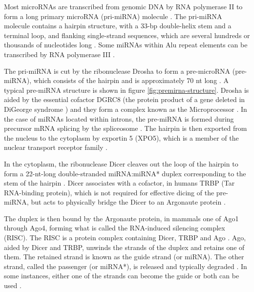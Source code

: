 Most microRNAs are transcribed from genomic DNA by RNA polymerase II to form a
long primary microRNA (pri-miRNA) molecule \citep{Lee2004}. The pri-miRNA molecule
contains a hairpin structure, with a 33-bp double-helix stem and a terminal
loop, and flanking single-strand sequences, which are several hundreds or
thousands of nucleotides long \citep{Kim2005}. Some miRNAs within Alu repeat elements
can be transcribed by RNA polymerase III \citep{Borchert2006}.

The pri-miRNA is cut by the ribonuclease Drosha to form %
a pre-microRNA (pre-miRNA), which consists of the hairpin and is
approximately 70 nt long \citep{Lee2003}. A typical pre-miRNA structure is
shown in figure \ref{fig:premirna-structure}. Drosha is aided by the essential
cofactor DGRC8 (the protein product of a gene deleted in DiGeorge syndrome \citep{Shiohama2003})
and they form a complex known as the Microprocessor \citep{Gregory2004}. In
the case of miRNAs located within introns, the pre-miRNA is formed during
precursor mRNA splicing by the spliceosome \citep{Ruby2007}. The hairpin is
then exported from the nucleus to the cytoplasm by exportin 5 (XPO5), which is
a member of the nuclear transport receptor family \citep{Lund2004}.

In the cytoplasm, the ribonuclease Dicer cleaves out the loop of the hairpin
to form a 22-nt-long double-stranded miRNA:miRNA* duplex corresponding to
the stem of the hairpin \citep{Bernstein2001}.
Dicer associates with a cofactor, in humans TRBP (Tar RNA-binding protein),
which is not required for effective dicing of the pre-miRNA,
but acts to physically bridge the Dicer to an Argonaute protein
\citep{Chendrimada2005}.

The duplex is then bound by the Argonaute protein, in mammals one of Ago1
through Ago4, forming what is called the RNA-induced silencing complex (RISC).
The RISC is a protein complex containing Dicer, TRBP and Ago \citep{Gregory2005}.
Ago, aided by Dicer and TRBP, unwinds the strands of the duplex and retains one of
them. The retained strand is known as the guide strand (or miRNA). The other
strand, called the passenger (or miRNA*), is released and typically degraded \citep{Du2005}.
In some instances, either one of the strands can become the guide
or both can be used \citep{Czech2009}.

